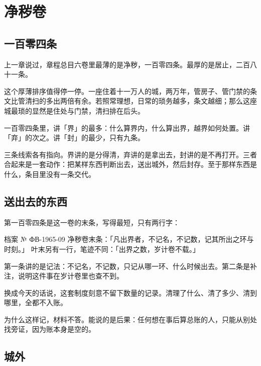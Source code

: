 \chapter{净秽卷}


\section{一百零四条}

上一章说过，章程总目六卷里最薄的是净秽，一百零四条。最厚的是居止，二百八十一条。

这个厚薄排序值得停一停。一座住着十一万人的城，两万年，管房子、管门禁的条文比管清扫的多出两倍有余。若照常理想，日常的琐务越多，条文越细；那么这座城最琐的显然是住处与门禁，清扫排在后头。

一百零四条里，讲「界」的最多：什么算界内，什么算出界，越界如何处置。讲「弃」的次之。讲「封」的最少，只有九条。

三条线索各有指向。界讲的是分得清，弃讲的是拿出去，封讲的是不再打开。三者合起来是一套动作：把某样东西判断出去，送出城外，然后封存。至于那样东西是什么，条目里没有一条交代。

\section{送出去的东西}

第一百零四条是这一卷的末条，写得最短，只有两行字：

\begin{archive}[内部参考]{档案 № ФВ-1965-09}
净秽卷末条：「凡出界者，不记名，不记数，记其所出之环与时刻。」
叶末另有一行，笔迹不同：「出界之数，岁计卷不载。」
\end{archive}

第一条讲的是记法：不记名，不记数，只记从哪一环、什么时候出去。第二条是补注，说明这件事在岁计卷里也查不到。

换成今天的话说，这套制度刻意不留下数量的记录。清理了什么、清了多少、清到哪里，全都不入账。

为什么这样记，材料不答。能说的是后果：任何想在事后算总账的人，只能从别处找旁证，因为账本身是空的。

\section{城外}

